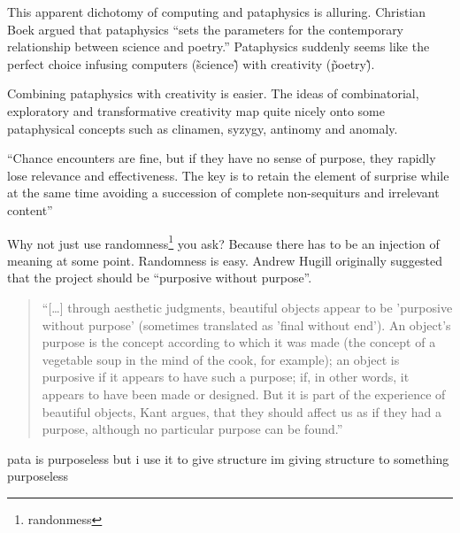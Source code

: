 This apparent dichotomy of computing and pataphysics is alluring. Christian Boek argued that pataphysics ``sets the parameters for the contemporary relationship between science and poetry.'' \autocite{Boek2002} Pataphysics suddenly seems like the perfect choice infusing computers (\~science\~) with creativity (\~poetry\~).

Combining pataphysics with creativity is easier. The ideas of  combinatorial, exploratory and transformative creativity map quite nicely onto some pataphysical concepts such as clinamen, syzygy, antinomy and anomaly.


\begin{fcom}

``Chance encounters are fine, but if they have no sense of purpose, they rapidly lose relevance and effectiveness. The key is to retain the element of surprise while at the same time avoiding a succession of complete non-sequiturs and irrelevant content'' \autocite{Hendler2011}


Why not just use randomness\footnote{randonmess} you ask? Because there has to be an injection of meaning at some point. Randomness is easy. Andrew Hugill originally suggested that the project should be ``purposive without purpose''.

\begin{quotation}
  ``[\ldots] through aesthetic judgments, beautiful objects appear to be 'purposive without purpose' (sometimes translated as 'final without end'). An object's purpose is the concept according to which it was made (the concept of a vegetable soup in the mind of the cook, for example); an object is purposive if it appears to have such a purpose; if, in other words, it appears to have been made or designed. But it is part of the experience of beautiful objects, Kant argues, that they should affect us as if they had a purpose, although no particular purpose can be found.'' 
\end{quotation}

pata is purposeless but i use it to give structure
im giving structure to something purposeless
\end{fcom}



